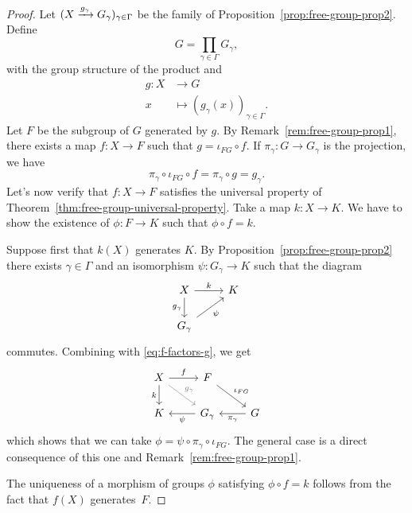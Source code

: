 \begin{proof}
    Let $(X\xrightarrow{g_\gamma}G_\gamma)_{\gamma\in\Gamma}$ be the family of Proposition~\ref{prop:free-group-prop2}. Define
    $$
        G = \prod_{\gamma\in\Gamma}G_\gamma,
    $$
    with the group structure of the product and
    \begin{align*}
        g\colon X&\to G\\
        x&\mapsto(g_\gamma(x))_{\gamma\in\Gamma}.
    \end{align*}
    Let $F$ be the subgroup of $G$ generated by $g$. By Remark~\ref{rem:free-group-prop1}, there exists a map $f\colon X\to F$ such that $g=\iota_{FG}\circ f$. If $\pi_\gamma\colon G\to G_\gamma$ is the projection, we have
    \begin{equation}\label{eq:f-factors-g}
        \pi_\gamma\circ\iota_{FG}\circ f= \pi_\gamma\circ g=g_\gamma.
    \end{equation}
    Let's now verify that $f\colon X\to F$ satisfies the universal property of Theorem~\ref{thm:free-group-universal-property}. Take a map $k\colon X\to K$. We have to show the existence of $\phi\colon F\to K$ such that $\phi\circ f=k$.
    
    Suppose first that $k(X)$ generates $K$. By Proposition~\ref{prop:free-group-prop2} there exists $\gamma\in\Gamma$ and an isomorphism $\psi\colon G_\gamma\to K$ such that the diagram
    $$
        \begin{tikzcd}
            X
                    \arrow[r,"k"]
                    \arrow[d,"g_\gamma"']
                &K\\
            G_\gamma
                    \arrow[ru,"\psi"']
        \end{tikzcd}
    $$
    commutes. Combining with \eqref{eq:f-factors-g}, we get
    $$
        \begin{tikzcd}
        X
                \arrow[d,"k"']
                \arrow[rd,"g_\gamma",color=gray]
                \arrow[r,"f"]
            &F\arrow[rd,"\iota_{FG}"]\\
        K
            &G_\gamma
                \arrow[l,"\psi"]
            &G
                \arrow[l,"\pi_\gamma"]
        \end{tikzcd}
    $$
    which shows that we can take $\phi=\psi\circ\pi_\gamma\circ\iota_{FG}$. The general case is a direct consequence of this one and Remark~\ref{rem:free-group-prop1}.

    The uniqueness of a morphism of groups $\phi$ satisfying $\phi\circ f=k$ follows from the fact that $f(X)$ generates~$F$.
\end{proof}



